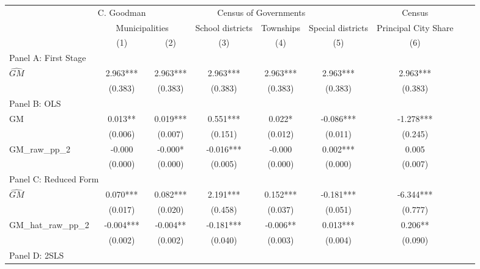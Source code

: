  \begin{tabular}{l*{8}{c}} \toprule
&\multicolumn{1}{c}{C. Goodman}&\multicolumn{4}{c}{Census of Governments}&\multicolumn{1}{c}{Census}\\\cmidrule(lr){2-2}\cmidrule(lr){3-6}\cmidrule(lr){7-7}
&\multicolumn{2}{c}{Municipalities}&\multicolumn{1}{c}{School districts}&\multicolumn{1}{c}{Townships}&\multicolumn{1}{c}{Special districts}&\multicolumn{1}{c}{Principal City Share}\\\cmidrule(lr){2-3}\cmidrule(lr){4-6}\cmidrule(lr){7-7}
&\multicolumn{1}{c}{(1)}&\multicolumn{1}{c}{(2)}&\multicolumn{1}{c}{(3)}&\multicolumn{1}{c}{(4)}&\multicolumn{1}{c}{(5)}&\multicolumn{1}{c}{(6)}\\
\cmidrule(lr){1-7}
\multicolumn{6}{l}{Panel A: First Stage}\\
\cmidrule(lr){1-7}
$\widehat{GM}$  &    2.963***&    2.963***&    2.963***&    2.963***&    2.963***&    2.963***\\
                &  (0.383)   &  (0.383)   &  (0.383)   &  (0.383)   &  (0.383)   &  (0.383)   \\
\cmidrule(lr){1-7}
\multicolumn{6}{l}{Panel B: OLS}\\
\cmidrule(lr){1-7}
GM              &    0.013** &    0.019***&    0.551***&    0.022*  &   -0.086***&   -1.278***\\
                &  (0.006)   &  (0.007)   &  (0.151)   &  (0.012)   &  (0.011)   &  (0.245)   \\
\addlinespace
GM\_raw\_pp\_2     &   -0.000   &   -0.000*  &   -0.016***&   -0.000   &    0.002***&    0.005   \\
                &  (0.000)   &  (0.000)   &  (0.005)   &  (0.000)   &  (0.000)   &  (0.007)   \\
\cmidrule(lr){1-7}
\multicolumn{6}{l}{Panel C: Reduced Form}\\
\cmidrule(lr){1-7}
$\widehat{GM}$  &    0.070***&    0.082***&    2.191***&    0.152***&   -0.181***&   -6.344***\\
                &  (0.017)   &  (0.020)   &  (0.458)   &  (0.037)   &  (0.051)   &  (0.777)   \\
\addlinespace
GM\_hat\_raw\_pp\_2 &   -0.004***&   -0.004** &   -0.181***&   -0.006** &    0.013***&    0.206** \\
                &  (0.002)   &  (0.002)   &  (0.040)   &  (0.003)   &  (0.004)   &  (0.090)   \\
\cmidrule(lr){1-7}
\multicolumn{6}{l}{Panel D: 2SLS}\\
\cmidrule(lr){1-7}

\end{tabular}
